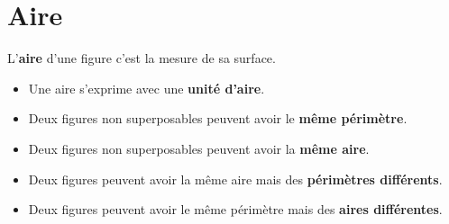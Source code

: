 \section{Aire}
\begin{definition}
    L'\textbf{aire} d'une figure c'est la mesure de sa surface.
\end{definition}

\begin{remarques}
    \begin{itemize}
        \item Une aire s'exprime avec une \textbf{unité d'aire}.
        \item Deux figures non superposables peuvent avoir le \textbf{même périmètre}.
        \item Deux figures non superposables peuvent avoir la \textbf{même aire}.
        \item Deux figures peuvent avoir la même aire mais des \textbf{périmètres différents}.
        \item Deux figures peuvent avoir le même périmètre mais des \textbf{aires différentes}.
    \end{itemize}


\end{remarques}

